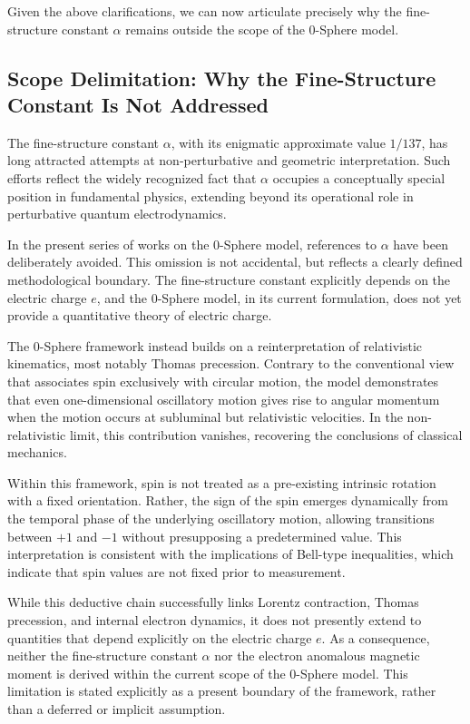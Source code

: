 \documentclass[12pt,letterpaper]{article}
\begin{document}
Given the above clarifications, we can now articulate precisely why the fine-structure constant $\alpha$ remains outside the scope of the 0-Sphere model.

\subsection{Scope Delimitation: Why the Fine-Structure Constant Is Not Addressed}

The fine-structure constant $\alpha$, with its enigmatic approximate value $1/137$, has long attracted attempts at non-perturbative and geometric interpretation. Such efforts reflect the widely recognized fact that $\alpha$ occupies a conceptually special position in fundamental physics, extending beyond its operational role in perturbative quantum electrodynamics.

In the present series of works on the 0-Sphere model, references to $\alpha$ have been deliberately avoided. This omission is not accidental, but reflects a clearly defined methodological boundary. The fine-structure constant explicitly depends on the electric charge $e$, and the 0-Sphere model, in its current formulation, does not yet provide a quantitative theory of electric charge.

The 0-Sphere framework instead builds on a reinterpretation of relativistic kinematics, most notably Thomas precession. Contrary to the conventional view that associates spin exclusively with circular motion, the model demonstrates that even one-dimensional oscillatory motion gives rise to angular momentum when the motion occurs at subluminal but relativistic velocities. In the non-relativistic limit, this contribution vanishes, recovering the conclusions of classical mechanics.

Within this framework, spin is not treated as a pre-existing intrinsic rotation with a fixed orientation. Rather, the sign of the spin emerges dynamically from the temporal phase of the underlying oscillatory motion, allowing transitions between $+1$ and $-1$ without presupposing a predetermined value. This interpretation is consistent with the implications of Bell-type inequalities, which indicate that spin values are not fixed prior to measurement.

While this deductive chain successfully links Lorentz contraction, Thomas precession, and internal electron dynamics, it does not presently extend to quantities that depend explicitly on the electric charge $e$. As a consequence, neither the fine-structure constant $\alpha$ nor the electron anomalous magnetic moment is derived within the current scope of the 0-Sphere model. This limitation is stated explicitly as a present boundary of the framework, rather than a deferred or implicit assumption.
\end{document}
